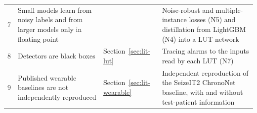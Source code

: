 \begin{xltabular}{\textwidth}{@{}cP{45mm}LL@{}}
\small 7 & \small Small models learn from noisy labels and from larger models only in floating point & \small \cite{shama2026bundl,zheng2023kdgnn} & \small Noise-robust and multiple-instance losses (N5) and distillation from LightGBM (N4) into a LUT network\\
\small 8 & \small Detectors are black boxes & \small Section~\ref{sec:lit-lut} & \small Tracing alarms to the inputs read by each LUT (N7)\\
\small 9 & \small Published wearable baselines are not independently reproduced & \small Section~\ref{sec:lit-wearable} & \small Independent reproduction of the SeizeIT2 ChronoNet baseline, with and without test-patient information\\
\bottomrule
\end{xltabular}
